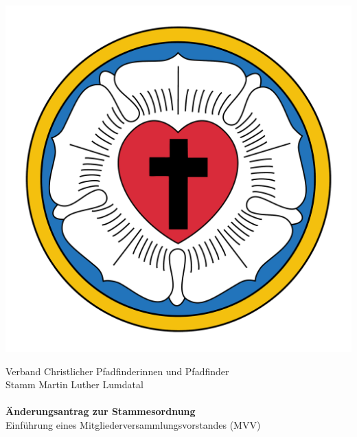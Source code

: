\documentclass[a4paper]{article}
\begin{document}
\begin{center}
    \begin{minipage}{.2\textwidth}
        \flushleft
        \includegraphics[width=1\linewidth]{Lutherrose.pdf}
    \end{minipage}%
    \begin{minipage}{.6\textwidth}
        \begin{center}
            \footnotesize Verband Christlicher Pfadfinderinnen und Pfadfinder\\
            \large Stamm Martin Luther Lumdatal\\
            ~\\
            \Large \textbf{Änderungsantrag zur Stammesordnung}\\
            \normalsize Einführung eines Mitgliederversammlungsvorstandes (MVV)\\
        \end{center}
    \end{minipage}%
    \begin{minipage}{.2\textwidth}
        \flushright

\end{minipage}
\end{center}
\end{document}
